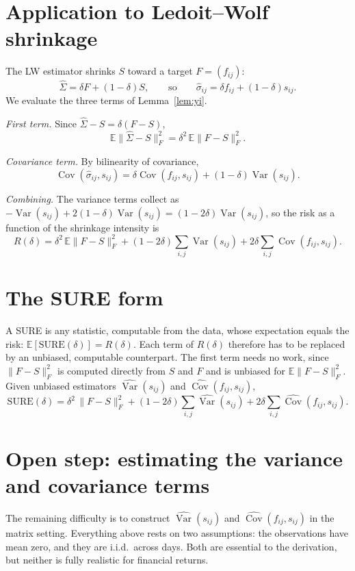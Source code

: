 \documentclass[11pt]{article}
\theoremstyle{remark}
\newcommand{\E}{\mathbb{E}}
\newcommand{\Var}{\operatorname{Var}}
\newcommand{\Cov}{\operatorname{Cov}}
\begin{document}
\section{Application to Ledoit--Wolf shrinkage}

The LW estimator shrinks $S$ toward a target $F = (f_{ij})$:
\[
\hat\Sigma = \delta F + (1-\delta) S,
\qquad\text{so}\qquad
\hat\sigma_{ij} = \delta f_{ij} + (1-\delta)s_{ij}.
\]
We evaluate the three terms of Lemma~\ref{lem:yi}.

\emph{First term.} Since $\hat\Sigma - S = \delta(F - S)$,
\[
\E\|\hat\Sigma - S\|_F^2 = \delta^2\,\E\|F - S\|_F^2 .
\]

\emph{Covariance term.} By bilinearity of covariance,
\[
\Cov(\hat\sigma_{ij}, s_{ij})
= \delta\Cov(f_{ij}, s_{ij}) + (1-\delta)\Var(s_{ij}).
\]

\emph{Combining.} The variance terms collect as
$-\Var(s_{ij}) + 2(1-\delta)\Var(s_{ij}) = (1-2\delta)\Var(s_{ij})$, so the
risk as a function of the shrinkage intensity is
\[
R(\delta) = \delta^2\,\E\|F - S\|_F^2
          + (1-2\delta)\sum_{i,j}\Var(s_{ij})
          + 2\delta\sum_{i,j}\Cov(f_{ij}, s_{ij}).
\]

\section{The SURE form}

A SURE is any statistic, computable from the data, whose expectation equals
the risk: $\E[\mathrm{SURE}(\delta)] = R(\delta)$. Each term of $R(\delta)$
therefore has to be replaced by an unbiased, computable counterpart. The
first term needs no work, since $\|F - S\|_F^2$ is computed directly from $S$
and $F$ and is unbiased for $\E\|F - S\|_F^2$. Given unbiased estimators
$\widehat{\Var}(s_{ij})$ and $\widehat{\Cov}(f_{ij}, s_{ij})$,
\[
\mathrm{SURE}(\delta) = \delta^2\,\|F - S\|_F^2
  + (1-2\delta)\sum_{i,j}\widehat{\Var}(s_{ij})
  + 2\delta\sum_{i,j}\widehat{\Cov}(f_{ij}, s_{ij}).
\]

\section{Open step: estimating the variance and covariance terms}

The remaining difficulty is to construct $\widehat{\Var}(s_{ij})$ and
$\widehat{\Cov}(f_{ij}, s_{ij})$ in the matrix setting. Everything above rests
on two assumptions: the observations have mean zero, and they are i.i.d.\
across days. Both are essential to the derivation, but neither is fully
realistic for financial returns.
\end{document}

